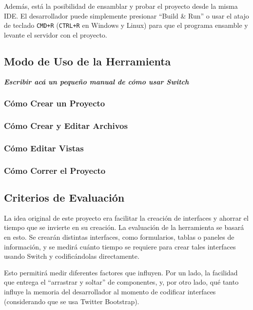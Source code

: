 \documentclass[12pt,titlepage,]{article}
\begin{document}
Además, está la posibilidad de ensamblar y probar el proyecto desde la
misma IDE. El desarrollador puede simplemente presionar ``Build \& Run''
o usar el atajo de teclado \texttt{CMD+R} (\texttt{CTRL+R} en Windows y
Linux) para que el programa ensamble y levante el servidor con el
proyecto.

\subsection{Modo de Uso de la Herramienta}

\textbf{\emph{Escribir acá un pequeño manual de cómo usar Switch}}

\subsubsection{Cómo Crear un Proyecto}

\subsubsection{Cómo Crear y Editar Archivos}

\subsubsection{Cómo Editar Vistas}

\subsubsection{Cómo Correr el Proyecto}

\subsection{Criterios de Evaluación}

La idea original de este proyecto era facilitar la creación de
interfaces y ahorrar el tiempo que se invierte en su creación. La
evaluación de la herramienta se basará en esto. Se crearán distintas
interfaces, como formularios, tablas o paneles de información, y se
medirá cuánto tiempo se requiere para crear tales interfaces usando
Switch y codificándolas directamente.

Esto permitirá medir diferentes factores que influyen. Por un lado, la
facilidad que entrega el ``arrastrar y soltar'' de componentes, y, por
otro lado, qué tanto influye la memoria del desarrollador al momento de
codificar interfaces (considerando que se usa Twitter Bootstrap).
\end{document}
